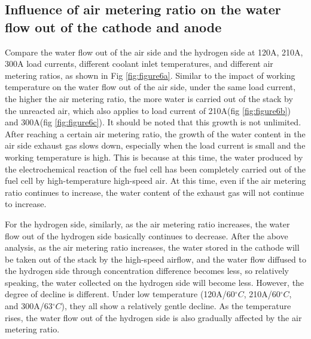 

\subsection{Influence of air metering ratio on the water flow out of the cathode and anode}

Compare the water flow out of the air side and the hydrogen side at 120A, 210A, 300A load currents, different coolant inlet temperatures, and different air metering ratios, as shown in Fig \ref{fig:figure6a}. Similar to the impact of working temperature on the water flow out of the air side, under the same load current, the higher the air metering ratio, the more water is carried out of the stack by the unreacted air, which also applies to load current of 210A(fig \ref{fig:figure6b}) and 300A(fig \ref{fig:figure6c}). It should be noted that this growth is not unlimited. After reaching a certain air metering ratio, the growth of the water content in the air side exhaust gas slows down, especially when the load current is small and the working temperature is high. This is because at this time, the water produced by the electrochemical reaction of the fuel cell has been completely carried out of the fuel cell by high-temperature high-speed air. At this time, even if the air metering ratio continues to increase, the water content of the exhaust gas will not continue to increase.

\par
For the hydrogen side, similarly, as the air metering ratio increases, the water flow out of the hydrogen side basically continues to decrease. After the above analysis, as the air metering ratio increases, the water stored in the cathode will be taken out of the stack by the high-speed airflow, and the water flow diffused to the hydrogen side through concentration difference becomes less, so relatively speaking, the water collected on the hydrogen side will become less. However, the degree of decline is different. Under low temperature (120A/60$^{\circ}C$, 210A/60$^{\circ}C$, and 300A/63$^{\circ}C$), they all show a relatively gentle decline. As the temperature rises, the water flow out of the hydrogen side is also gradually affected by the air metering ratio.

